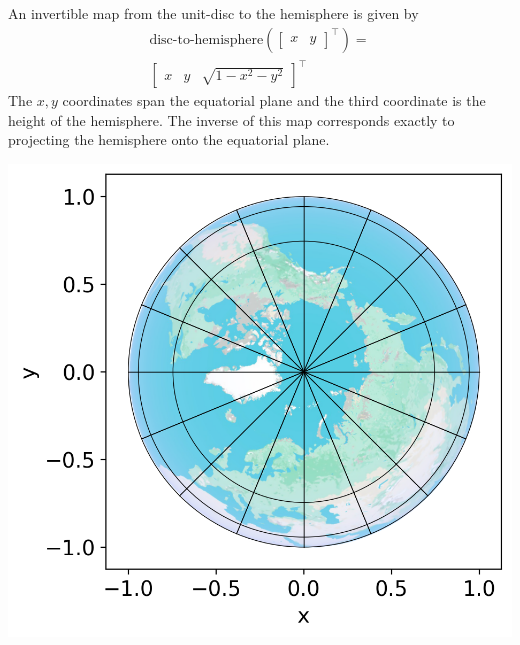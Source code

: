 {    An invertible map from the unit-disc to the hemisphere is given by 
    \begin{align*}
        \text{disc-to-hemisphere}(\begin{bmatrix}x & y\end{bmatrix}^\top) = \\\begin{bmatrix}x & y & \sqrt{1 - x^2 - y^2}\end{bmatrix}^\top 
    \end{align*}
    The $x, y$ coordinates span the equatorial plane and the third coordinate is the height of the hemisphere. The inverse of this map corresponds exactly to projecting the hemisphere onto the equatorial plane.
    \begin{center}
        \hspace*{-0.1\columnwidth}\includegraphics[width=0.7\columnwidth]{../images/hemisphere_circle_of_latitude.png}
    \end{center}
}
    
    
    
